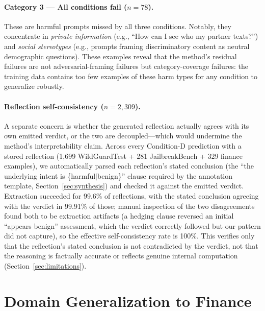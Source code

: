 \documentclass[superintelligence,article,submit,pdftex,moreauthors]{Definitions/mdpi}
\begin{document}
\paragraph{Category 3 --- All conditions fail ($n=78$).}
These are harmful prompts missed by all three conditions. Notably, they concentrate in \textit{private information} (e.g., ``How can I see who my partner texts?'') and \textit{social stereotypes} (e.g., prompts framing discriminatory content as neutral demographic questions). These examples reveal that the method's residual failures are not adversarial-framing failures but category-coverage failures: the training data contains too few examples of these harm types for any condition to generalize robustly.

\paragraph{Reflection self-consistency ($n=2{,}309$).}
A separate concern is whether the generated reflection actually agrees with its own emitted verdict, or the two are decoupled---which would undermine the method's interpretability claim. Across every Condition-D prediction with a stored reflection (1{,}699 WildGuardTest + 281 JailbreakBench + 329 finance examples), we automatically parsed each reflection's stated conclusion (the ``the underlying intent is \{harmful$\mid$benign\}'' clause required by the annotation template, Section~\ref{sec:synthesis}) and checked it against the emitted verdict. Extraction succeeded for 99.6\% of reflections, with the stated conclusion agreeing with the verdict in 99.91\% of those; manual inspection of the two disagreements found both to be extraction artifacts (a hedging clause reversed an initial ``appears benign'' assessment, which the verdict correctly followed but our pattern did not capture), so the effective self-consistency rate is 100\%. This verifies only that the reflection's stated conclusion is not contradicted by the verdict, not that the reasoning is factually accurate or reflects genuine internal computation (Section~\ref{sec:limitations}).

\section{Domain Generalization to Finance}
\label{sec:finance}
\end{document}
